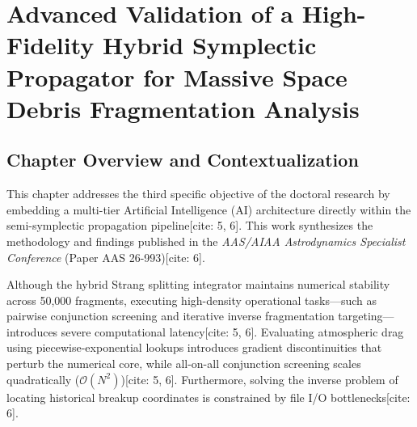 \documentclass[12pt,letterpaper,twoside]{book}
\begin{document}
\newpage


\cleardoublepage

\chapter{Advanced Validation of a High-Fidelity Hybrid Symplectic Propagator for Massive Space Debris Fragmentation Analysis}
\label{ch:paper3}

\section*{Chapter Overview and Contextualization}
This chapter addresses the third specific objective of the doctoral research by embedding a multi-tier Artificial Intelligence (AI) architecture directly within the semi-symplectic propagation pipeline[cite: 5, 6]. This work synthesizes the methodology and findings published in the \textit{AAS/AIAA Astrodynamics Specialist Conference} (Paper AAS 26-993)[cite: 6].

Although the hybrid Strang splitting integrator maintains numerical stability across 50,000 fragments, executing high-density operational tasks—such as pairwise conjunction screening and iterative inverse fragmentation targeting—introduces severe computational latency[cite: 5, 6]. Evaluating atmospheric drag using piecewise-exponential lookups introduces gradient discontinuities that perturb the numerical core, while all-on-all conjunction screening scales quadratically ($\mathcal{O}(N^2)$)[cite: 5, 6]. Furthermore, solving the inverse problem of locating historical breakup coordinates is constrained by file I/O bottlenecks[cite: 6].
\end{document}

